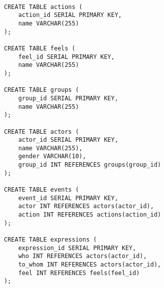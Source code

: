 \begin{verbatim}

CREATE TABLE actions (
    action_id SERIAL PRIMARY KEY,
    name VARCHAR(255)
);

CREATE TABLE feels (
    feel_id SERIAL PRIMARY KEY,
    name VARCHAR(255)
);

CREATE TABLE groups (
    group_id SERIAL PRIMARY KEY,
    name VARCHAR(255)
);

CREATE TABLE actors (
    actor_id SERIAL PRIMARY KEY,
    name VARCHAR(255),
    gender VARCHAR(10),
    group_id INT REFERENCES groups(group_id)
);

CREATE TABLE events (
    event_id SERIAL PRIMARY KEY,
    actor INT REFERENCES actors(actor_id),
    action INT REFERENCES actions(action_id)
);

CREATE TABLE expressions (
    expression_id SERIAL PRIMARY KEY,
    who INT REFERENCES actors(actor_id),
    to_whom INT REFERENCES actors(actor_id),
    feel INT REFERENCES feels(feel_id)
);

\end{verbatim}
